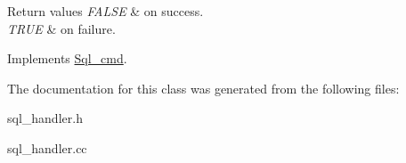 \begin{DoxyRetVals}{Return values}
{\em F\+A\+L\+SE} & on success. \\
\hline
{\em T\+R\+UE} & on failure. \\
\hline
\end{DoxyRetVals}


Implements \mbox{\hyperlink{classSql__cmd_a213367b79b551296fbb7790f2a3732fb}{Sql\+\_\+cmd}}.



The documentation for this class was generated from the following files\+:\begin{DoxyCompactItemize}
\item 
sql\+\_\+handler.\+h\item 
sql\+\_\+handler.\+cc\end{DoxyCompactItemize}
